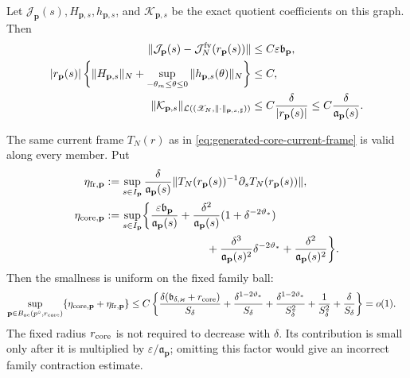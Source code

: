 \begin{lemma}
Let
\(\mathcal J_{\mathbf p}(s),H_{\mathbf p,s},h_{\mathbf p,s}\), and
\(\mathcal K_{\mathbf p,s}\) be the exact quotient coefficients on this
graph.  Then
\begin{align}
 \|\mathcal J_{\mathbf p}(s)
       -\mathcal J_N^{\rm fv}(r_{\mathbf p}(s))\|
 &\le C\varepsilon\mathfrak b_{\mathbf p},     \label{eq:oe-family-core-current-difference}\\
 |r_{\mathbf p}(s)|\left\{
       \|H_{\mathbf p,s}\|_N
       +\sup_{-\theta_m\le\theta\le0}
          \|h_{\mathbf p,s}(\theta)\|_N\right\}
 &\le C,                                        \label{eq:oe-family-core-resource-coefficients}\\
 \|\mathcal K_{\mathbf p,s}\|_{
  \mathcal L((\mathscr X_N,\|\cdot\|_{\mathbf p,s,\sharp}))}
 &\le C\frac{\delta}{|r_{\mathbf p}(s)|}
 \le C\frac{\delta}{\mathfrak a_{\mathbf p}(s)}.
                                                        \label{eq:oe-family-core-volterra}
\end{align}

The same current frame \(T_N(r)\) as in
\cref{eq:generated-core-current-frame} is valid along every member.  Put
\begin{align}
 \eta_{{\rm fr},\mathbf p}
 &:=\sup_{s\in I_{\mathbf p}}
   \frac{\delta}{\mathfrak a_{\mathbf p}(s)}
   \|T_N(r_{\mathbf p}(s))^{-1}
         \partial_sT_N(r_{\mathbf p}(s))\|,\notag\\
 \eta_{{\rm core},\mathbf p}
 &:=\sup_{s\in I_{\mathbf p}}\biggl\{
 \frac{\varepsilon\mathfrak b_{\mathbf p}}
      {\mathfrak a_{\mathbf p}(s)}
 +\frac{\delta^2}{\mathfrak a_{\mathbf p}(s)}
       (1+\delta^{-2\vartheta_*})\notag\\
 &\hspace{32mm}
 +\frac{\delta^3}{\mathfrak a_{\mathbf p}(s)^2}
       \delta^{-2\vartheta_*}
 +\frac{\delta^2}{\mathfrak a_{\mathbf p}(s)^2}
 \biggr\}.                                      \label{eq:oe-family-core-contraction-number}
\end{align}
Then the smallness is uniform on the fixed family ball:
\begin{align}
 \sup_{\mathbf p\in B_{\rm oe}(p^\circ,r_{\rm core})}
 \{\eta_{{\rm core},\mathbf p}
       +\eta_{{\rm fr},\mathbf p}\}
 &\le C\left\{
  \frac{\delta(\mathfrak b_{\delta,\varkappa}+r_{\rm core})}
       {S_\delta}
 +\frac{\delta^{1-2\vartheta_*}}{S_\delta}
 +\frac{\delta^{1-2\vartheta_*}}{S_\delta^2}
 +\frac1{S_\delta^2}+\frac\delta{S_\delta}\right\}
 =o(1).                                         \label{eq:oe-family-core-contraction-closes}
\end{align}
The fixed radius \(r_{\rm core}\) is not required to decrease with
\(\delta\).  Its contribution is small only after it is multiplied by
\(\varepsilon/\mathfrak a_{\mathbf p}\); omitting this factor would give
an incorrect family contraction estimate.
\end{lemma}


